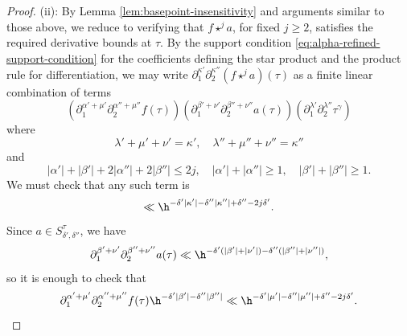 \begin{proof}
  (ii): By Lemma \ref{lem:basepoint-insensitivity} and arguments similar to those above, we reduce to verifying that $f \star^j a$, for fixed $j \geq 2$, satisfies the required derivative bounds at $\tau$.  By the support condition \eqref{eq:alpha-refined-support-condition} for the coefficients defining the star product and the product rule for differentiation, we may write $\partial_1^{\kappa '} \partial_2^{\kappa ''} (f \star^j a)(\tau)$ as a finite linear combination of terms
  \[
    \left( \partial_{1}^{\alpha ' + \mu '} \partial_2^{\alpha '' + \mu ''} f(\tau) \right) \left( \partial_{1}^{\beta ' + \nu '} \partial_2^{\beta '' + \nu ''} a(\tau) \right) \left( \partial_1^{\lambda '} \partial_2^{\lambda ''} \tau^{\gamma} \right)
  \]
  where
  \[
    \lambda ' + \mu ' + \nu ' = \kappa ', \quad \lambda '' + \mu '' + \nu '' = \kappa ''
  \]
  and
  \begin{equation}\label{eqn:key-alpha-beta-ineqs}
    |\alpha '| + |\beta '|
    +
    2 |\alpha ''| + 2 |\beta ''|
    \leq 2 j,
    \quad
    |\alpha '| + |\alpha ''| \geq 1,
    \quad
    |\beta '| + |\beta ''| \geq 1.
  \end{equation}
  We must check that any such term is
  \[
    \ll \h^{- \delta ' |\kappa '| - \delta '' | \kappa ''| + \delta '' - 2 j \delta '}.
  \]
  Since $a \in S^\tau_{\delta ', \delta ''}$, we have
  \begin{equation}\label{eqn:estimates-for-a-for-f-star-a}
    \partial_{1}^{\beta ' + \nu '} \partial_2^{\beta '' + \nu ''} a(\tau)
    \ll
    \h^{- \delta '( |\beta '| +  |\nu '|) - \delta ''(|\beta ''| + |\nu ''|)},
  \end{equation}
  so it is enough to check that
  \begin{equation}\label{eqn:f-star-a-desiderata-f}
    \partial_{1}^{\alpha ' + \mu '} \partial_2^{\alpha '' + \mu ''} f(\tau)
    \h^{ - \delta ' |\beta '|-  \delta ''|\beta ''|}
    \ll
    \h^{- \delta ' |\mu '| - \delta '' | \mu ''| + \delta '' - 2 j \delta '}.
  \end{equation}


\end{proof}
